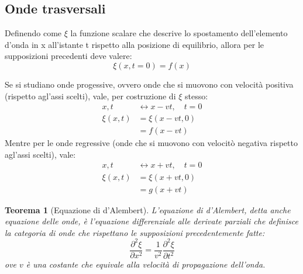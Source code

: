 \documentclass[11pt, a4paper, openright]{book}
\theoremstyle{plain}
\newtheorem{theorem}{Teorema}[section]
\theoremstyle{definition}
\begin{document}
\subsection{Onde trasversali}
Definendo come $\xi$ la funzione scalare che descrive lo spostamento dell'elemento d'onda in x all'istante t rispetto alla posizione di equilibrio, allora per le supposizioni precedenti deve valere:
\begin{equation}
    \xi(x, t = 0) = f(x)
\end{equation}

Se si studiano onde progessive, ovvero onde che si muovono con velocità positiva (rispetto agl'assi scelti), vale, per costruzione di $\xi$ stesso:
\begin{align}
    x, t &\longleftrightarrow x - vt, \quad t = 0 \\
    \xi(x, t) &= \xi(x - vt, 0) \\
              &= f(x - vt)
\end{align}
Mentre per le onde regressive (onde che si muovono con velocitò negativa rispetto agl'assi scelti), vale:
\begin{align}
    x, t &\longleftrightarrow x + vt, \quad t = 0 \\
    \xi(x, t) &= \xi(x + vt, 0) \\
              &= g(x + vt)
\end{align}

\begin{theorem}[Equazione di d'Alembert]
L'equazione di d'Alembert, detta anche equazione delle onde, è l'equazione
differenziale alle derivate parziali che definisce la categoria di onde che
rispettano le supposizioni precedentemente fatte:
\begin{equation}
    \frac{\partial^2 \xi}{\partial x^2} = \frac{1}{v^2} \frac{\partial^2 \xi}{\partial t^2}
\end{equation}
ove $v$ è una costante che equivale alla velocità di propagazione dell'onda.
\end{theorem}
\end{document}
